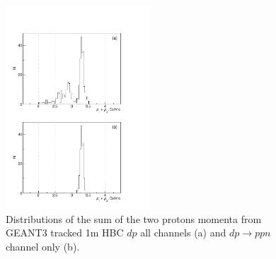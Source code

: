 \documentclass[twocolumn,epjc3]{svjour3}
\newcommand{\dpfrag} {\ensuremath{dp \rightarrow ppn}\xspace}
\begin{document}
\begin{figure}[h]
  \centering
  \includegraphics[width=0.48\textwidth]{p1_plus_p2_2.pdf}
  \caption{Distributions of the sum of the two protons momenta from GEANT3
    tracked 1m HBC $dp$ all channels (a) and \dpfrag channel only (b).}
  \label{fig:p1p2sim}
\end{figure}






%
\end{document}
